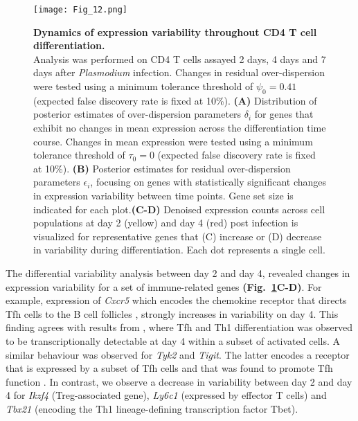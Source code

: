 \begin{figure}[!h]
\centering
\texttt{[image: Fig\_12.png]}
\caption[Dynamics of expression variability throughout CD4\plus{} T cell differentiation]{\textbf{Dynamics of expression variability throughout CD4\plus{} T cell differentiation.}\\
Analysis was performed on CD4\plus{} T cells assayed 2 days, 4 days and 7 days after \textit{Plasmodium} infection. Changes in residual over-dispersion were tested using a minimum tolerance threshold of $\psi_0=0.41$ (expected false discovery rate is fixed at 10\%). \textbf{(A)} Distribution of posterior estimates of over-dispersion parameters $\delta_i$ for genes that exhibit no changes in mean expression across the differentiation time course. Changes in mean expression were tested using a minimum tolerance threshold of $\tau_0=0$ (expected false discovery rate is fixed at 10\%). \textbf{(B)} Posterior estimates for residual over-dispersion parameters  $\epsilon_i$, focusing on genes with statistically significant changes in expression variability between time points. Gene set size is indicated for each plot.\textbf{(C-D)} Denoised expression counts across cell populations at day 2 (yellow) and day 4 (red) post infection is visualized for representative genes that (C) increase or (D) decrease in variability during differentiation. Each dot represents a single cell.\\}
\label{fig2:immune_differentiation}
\end{figure}

The differential variability analysis between day 2 and day 4, revealed  changes in expression variability for a set of immune-related genes \textbf{(Fig.~\ref{fig2:immune_differentiation}C-D)}. For example, expression of \textit{Cxcr5} which encodes the chemokine receptor that directs Tfh cells to the B cell follicles \citep{Crotty2014}, strongly increases in variability on day 4. This finding agrees with results from \cite{Lonnberg2017}, where Tfh and Th1 differentiation was observed to be transcriptionally detectable at day 4 within a subset of activated cells. A similar behaviour was observed for \textit{Tyk2} and \textit{Tigit}. The latter encodes a receptor that is expressed by a subset of Tfh cells and that was found to promote Tfh function \citep{Godefroy2015}. In contrast, we observe a decrease in variability between day 2 and day 4 for \textit{Ikzf4} (Treg-associated gene), \textit{Ly6c1} (expressed by effector T cells) and \textit{Tbx21} (encoding the Th1 lineage-defining transcription factor Tbet). \\


